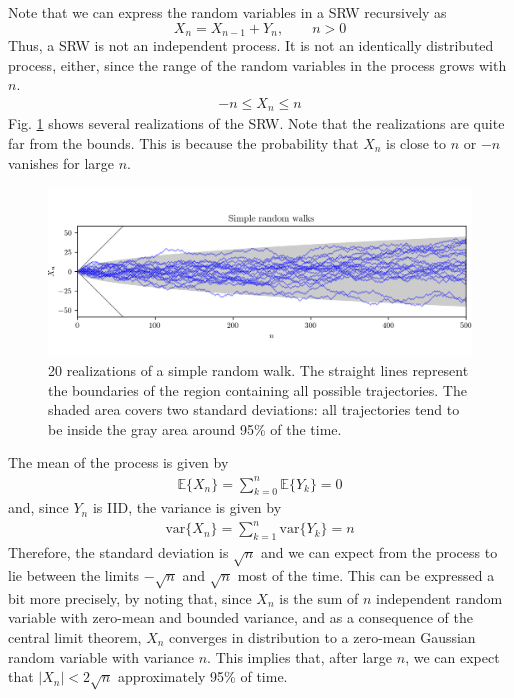 Note that we can express the random variables in a SRW recursively as
 \begin{equation}
X_n = X_{n-1} + Y_n,    \qquad  n>0
\label{sp:srw_rec}
\end{equation}
Thus, a SRW is not an independent process. It is not an identically distributed process, either, since the range of the random variables in the process grows with $n$. 
\begin{align}
-n \le X_n \le n
\end{align}
Fig. \ref{fig:sp_srw} shows several realizations of the SRW. Note that the realizations are quite far from the bounds. This is because the probability that $X_n$ is close to $n$ or $-n$ vanishes for large $n$.
\begin{figure}[htb]
  \begin{center}
    \includegraphics[width=14cm]{Figures//sp_random_walk_1d.png} 
    \caption{20 realizations of a simple random walk. The straight lines represent the boundaries of the region containing all possible trajectories. The shaded area covers two standard deviations: all trajectories tend to be inside the gray area around 95\% of the time.}
    \label{fig:sp_srw}
  \end{center}
\end{figure}

The mean of the process is given by
\begin{align}
\mathbb{E}\{X_n\} = \sum_{k=0}^n \mathbb{E}\{Y_k\} = 0
\end{align}
and, since $Y_n$ is IID, the variance is given by
\begin{align}
\text{var}\{X_n\} = \sum_{k=1}^n \text{var}\{Y_k\} = n
\end{align}
Therefore, the standard deviation is $\sqrt{n}$ and we can expect from the process to lie between the limits $-\sqrt{n}$ and $\sqrt{n}$ most of the time. This can be expressed a bit more precisely, by noting that, since $X_n$ is the sum of $n$ independent random variable with zero-mean and bounded variance, and as a consequence of the central limit theorem, $X_n$ converges in distribution to a zero-mean Gaussian random variable with variance $n$. This implies that, after large $n$, we can expect that $|X_n| < 2\sqrt{n}$ approximately 95\% of time.

